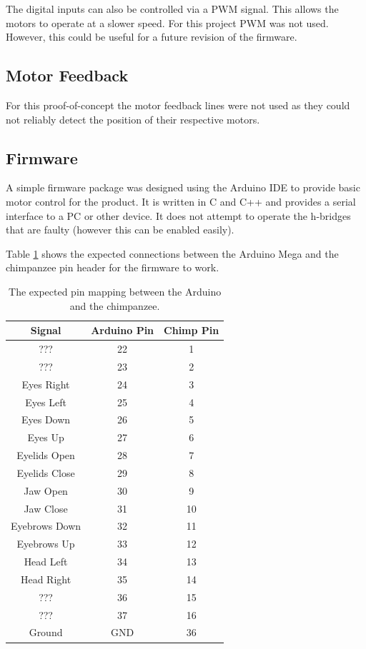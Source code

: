 \documentclass[12pt]{article} %
\begin{document}
The digital inputs can also be controlled via a PWM signal.
This allows the motors to operate at a slower speed.
For this project PWM was not used.
However, this could be useful for a future revision of the firmware.

\subsection{Motor Feedback}

For this proof-of-concept the motor feedback lines were not used as they could not reliably detect the position of their respective motors.

\subsection{Firmware}

A simple firmware package was designed using the Arduino IDE to provide basic motor control for the product.
It is written in C and C++ and provides a serial interface to a PC or other device. 
It does not attempt to operate the h-bridges that are faulty (however this can be enabled easily).

Table \ref{tab:pinmap} shows the expected connections between the Arduino Mega and the chimpanzee pin header for the firmware to work.

\begin{table}[h]
	\caption{The expected pin mapping between the Arduino and the chimpanzee.}
	\centering
	\begin{tabular}{ |c|c|c| }
		\hline
		\textbf{Signal} & \textbf{Arduino Pin} & \textbf{Chimp Pin} \\
		\hline
		??? & 22 & 1 \\
		??? & 23 & 2 \\
		Eyes Right & 24 & 3 \\
		Eyes Left & 25 & 4 \\
		Eyes Down & 26 & 5 \\
		Eyes Up & 27 & 6\\
		Eyelids Open & 28 & 7 \\
		Eyelids Close & 29 & 8 \\
		Jaw Open & 30 & 9 \\
		Jaw Close & 31 & 10 \\
		Eyebrows Down & 32 & 11 \\
		Eyebrows Up & 33 & 12 \\
		Head Left & 34 & 13 \\
		Head Right & 35 & 14\\
		??? & 36 & 15 \\
		??? & 37 & 16 \\
		Ground & GND & 36 \\
		\hline
	\end{tabular}
	\label{tab:pinmap}
\end{table}
\end{document}
